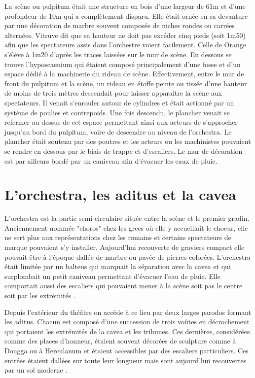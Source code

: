 		La scène ou \gls{pulpitum} était une structure en bois d'une largeur de 61m et d'une profondeur de 10m qui a complètement disparu. Elle était ornée en sa devanture par une décoration de marbre souvent composée de niches rondes ou carrées alternées. Vitruve dit que sa hauteur ne doit pas excéder cinq pieds (soit 1m50) afin que les spectateurs assis dans l'orchestre voient facilement. Celle de Orange s'élève à 1m20 d'après les traces laissées sur le mur de scène. En dessous se trouve l'hyposcaenium qui étaient composé principalement d'une fosse et d'un espace dédié à la machinerie du rideau de scène. Effectivement, entre le mur de front du \gls{pulpitum} et la scène, un rideau en étoffe peinte ou tissée d'une hauteur de moins de trois mètres descendait pour laisser apparaitre la scène aux spectateurs. Il venait s'enrouler autour de cylindres et était actionné par un système de poulies et contrepoids. Une fois descendu, le plancher venait se refermer au dessus de cet espace permettant ainsi aux acteurs de s'approcher jusqu'au bord du \gls{pulpitum}, voire de descendre au niveau de l'\gls{orchestra}. Le plancher était soutenu par des poutres et les acteurs ou les machinistes pouvaient se rendre en dessous par le biais de trappe et d'escaliers. Le mur de décoration est par ailleurs bordé par un caniveau afin d'évacuer les eaux de pluie.
						
		
\section{L'\gls{orchestra}, les \gls{aditus} et la \gls{cavea}}		
	
	L'\gls{orchestra} est la partie semi-circulaire située entre la scène et le premier gradin. Anciennement nommée "choros" chez les grecs où elle y accueillait le choeur, elle ne sert plus aux représentations chez les romains et certains spectateurs de marque pouvaient s'y installer. Aujourd'hui recouverte de graviers compact elle pouvait être à l'époque dallée de marbre ou pavée de pierres colorées. L'\gls{orchestra} était limitée par un \gls{balteus} qui marquait la séparation avec la \gls{cavea} et qui surplombait un petit caniveau permettant d'évacuer l'eau de pluie. Elle comportait aussi des escaliers qui pouvaient mener à la scène soit pas le centre soit par les extrémités \citep[p. 52]{formige}.
	
	Depuis l'extérieur du théâtre on accède à ce lieu par deux larges \gls{parodos} formant les \gls{aditus}. Chacun est composé d'une succession de trois voûtes en décrochement qui portaient les extrémités de la \gls{cavea} et les tribunes. Ces dernières, considérées comme des places d'honneur, étaient souvent décorées de sculpture comme à Dougga ou à Herculanum et étaient accessibles par des escaliers particuliers. Ces entrées étaient dallées sur toute leur longueur mais sont aujourd'hui recouvertes par un sol moderne \cite[Pl. XVI]{orangePl}.
	
